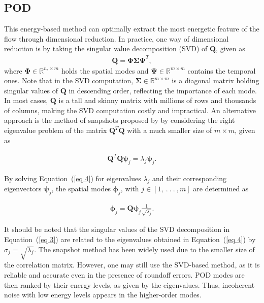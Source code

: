 \documentclass[a4paper,fleqn]{cas-sc}
\begin{document}
	\subsection{POD}
	\label{POD}
	
	This energy-based method can optimally extract the most energetic feature of the flow through dimensional reduction. In practice, one way of dimensional reduction is by taking the singular value decomposition (SVD) of $\mathbf{Q}$, given as
	\begin{align}
		\mathbf{Q} = \mathbf{\Phi} \mathbf{\Sigma} \mathbf{\Psi}^T ,\label{eq 3}
	\end{align}
	\noindent where $\mathbf{\Phi} \in \mathbb{R}^{n_s\times m}$ holds the spatial modes and $\mathbf{\Psi}\in \mathbb{R}^{m\times m}$ contains the temporal ones. Note that in the SVD computation, $\mathbf{\Sigma}\in \mathbb{R}^{m\times m}$ is a diagonal matrix holding singular values of $\mathbf{Q}$ in descending order, reflecting the importance of each mode. In most cases, $\mathbf{Q}$ is a tall and skinny matrix with millions of rows and thousands of columns, making the SVD computation costly and impractical. An alternative approach is the method of snapshots proposed by \citet{Sirovich1987} by considering the right eigenvalue problem of the matrix $\mathbf{Q}^T\mathbf{Q}$ with a much smaller size of $m\times m$, given as 
	
	\begin{align}
		\mathbf{Q}^T\mathbf{Q}\boldsymbol{\psi} _j = \lambda _j \boldsymbol{\psi} _j.\label{eq 4}
	\end{align}
	
	\noindent By solving Equation~(\ref{eq 4}) for eigenvalues $\lambda _j$ and their corresponding eigenvectors $\boldsymbol{\psi} _j$, the spatial modes $\boldsymbol{\phi} _j$, with $j\in [1,~.~.~.~, m]$ are determined as
	
	\begin{align}
		\boldsymbol{\phi} _j = \mathbf{Q} \boldsymbol{\psi} _j \frac{1}{\sqrt{\lambda _j}}.\label{eq 5}
	\end{align}
	
	\noindent It should be noted that the singular values of the SVD decomposition in Equation~(\ref{eq 3}) are related to the eigenvalues obtained in Equation~(\ref{eq 4}) by $\sigma_j = \sqrt{\lambda_j}$. The snapshot method has been widely used due to the smaller size of the correlation matrix. However, one may still use the SVD-based method, as it is reliable and accurate even in the presence of roundoff errors. POD modes are then ranked by their energy levels, as given by the eigenvalues. Thus, incoherent noise with low energy levels appears in the higher-order modes.
	
\end{document}
